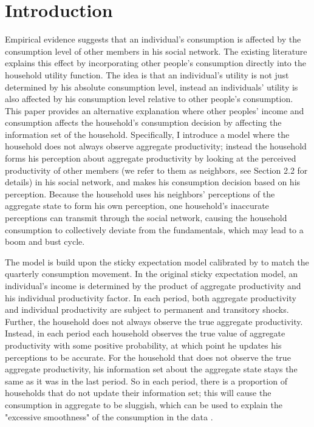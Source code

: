 \documentclass[12pt,letterpaper]{article}
\begin{document}
\section{Introduction}
Empirical evidence suggests that an individual’s consumption is affected by the consumption level of other members in his social network. \cite[]{PeerEvidence} The existing literature explains this effect by incorporating other people's consumption directly into the household utility function. \cite[]{GaliKeep}\cite[]{Veblen1996} The idea is that an individual's utility is not just determined by his absolute consumption level, instead an individuals' utility is also affected by his consumption level relative to other people's consumption.
This paper provides an alternative explanation where other peoples' income and consumption affects the household's consumption decision by affecting the information set of the household. Specifically, I introduce a model where the household does not always observe aggregate productivity; instead the household forms his perception about aggregate productivity by looking at the perceived productivity of other members (we refer to them as neighbors, see Section 2.2 for details) in his social network, and makes his consumption decision based on his perception.
Because the household uses his neighbors' perceptions of the aggregate state to form his own perception, one household's inaccurate perceptions can transmit through the social network, causing the household consumption to collectively deviate from the fundamentals, which may lead to a boom and bust cycle.\par
The model is build upon the sticky expectation model calibrated by \cite{StickyE} to match the quarterly consumption movement. In the original sticky expectation model, an individual's income is determined by the product of aggregate productivity and his individual productivity factor. In each period, both aggregate productivity and individual productivity are subject to permanent and transitory shocks. Further, the household does not always observe the true aggregate productivity. Instead, in each period each household observes the true value of aggregate productivity with some positive probability, at which point he updates his perceptions to be accurate. For the household that does not observe the true aggregate productivity, his information set about the aggregate state stays the same as it was in the last period. So in each period, there is a proportion of households that do not update their information set; this will cause the consumption in aggregate to be sluggish, which can be used to explain the "excessive smoothness" of the consumption in the data \cite[]{EvidenceSlugg}.\par
\end{document}
